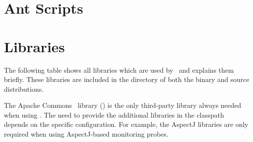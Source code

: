 \chapter{Ant Scripts}\label{appendix:antScripts}


\chapter{Libraries}\label{appendix:libraries}
    The following table shows all libraries which are used by \Kieker\ and explains them briefly. %
These libraries are included in the  directory of both the \Kieker{} binary and %
source distributions.

The Apache Commons~\cite{CommonsLogging-WebSite} library (\file{\commonsLoggingJar}) %
is the only third-party library always needed when using \Kieker{}. %
The need to provide the additional libraries in the classpath depends on the %
specific configuration. For example, the AspectJ libraries are only required %
when using AspectJ-based monitoring probes.



